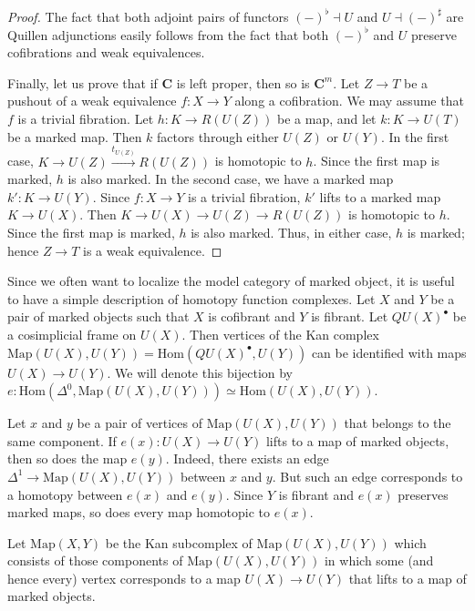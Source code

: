 \documentclass[reqno]{amsart}
\theoremstyle{definition}
\theoremstyle{remark}
\newcommand{\cat}[1]{\mathbf{#1}}
\newcommand{\C}{\cat{C}}
\newcommand{\Hom}{\mathrm{Hom}}
\newcommand{\Map}{\mathrm{Map}}
\numberwithin{figure}{section}
\begin{document}
\begin{proof}
The fact that both adjoint pairs of functors $(-)^\flat \dashv U$ and $U \dashv (-)^\sharp$ are Quillen adjunctions
easily follows from the fact that both $(-)^\flat$ and $U$ preserve cofibrations and weak equivalences.

Finally, let us prove that if $\C$ is left proper, then so is $\C^m$.
Let $Z \to T$ be a pushout of a weak equivalence $f : X \to Y$ along a cofibration.
We may assume that $f$ is a trivial fibration.
Let $h : K \to R(U(Z))$ be a map, and let $k : K \to U(T)$ be a marked map.
Then $k$ factors through either $U(Z)$ or $U(Y)$.
In the first case, $K \to U(Z) \xrightarrow{t_{U(Z)}} R(U(Z))$ is homotopic to $h$.
Since the first map is marked, $h$ is also marked.
In the second case, we have a marked map $k' : K \to U(Y)$.
Since $f : X \to Y$ is a trivial fibration, $k'$ lifts to a marked map $K \to U(X)$.
Then $K \to U(X) \to U(Z) \to R(U(Z))$ is homotopic to $h$.
Since the first map is marked, $h$ is also marked.
Thus, in either case, $h$ is marked; hence $Z \to T$ is a weak equivalence.
\end{proof}

Since we often want to localize the model category of marked object, it is useful to have a simple description of homotopy function complexes.
Let $X$ and $Y$ be a pair of marked objects such that $X$ is cofibrant and $Y$ is fibrant.
Let $QU(X)^\bullet$ be a cosimplicial frame on $U(X)$.
Then vertices of the Kan complex $\Map(U(X),U(Y)) = \Hom(QU(X)^\bullet,U(Y))$ can be identified with maps $U(X) \to U(Y)$.
We will denote this bijection by $e : \Hom(\Delta^0,\Map(U(X),U(Y))) \simeq \Hom(U(X),U(Y))$.

Let $x$ and $y$ be a pair of vertices of $\Map(U(X),U(Y))$ that belongs to the same component.
If $e(x) : U(X) \to U(Y)$ lifts to a map of marked objects, then so does the map $e(y)$.
Indeed, there exists an edge $\Delta^1 \to \Map(U(X),U(Y))$ between $x$ and $y$.
But such an edge corresponds to a homotopy between $e(x)$ and $e(y)$.
Since $Y$ is fibrant and $e(x)$ preserves marked maps, so does every map homotopic to $e(x)$.

Let $\Map(X,Y)$ be the Kan subcomplex of $\Map(U(X),U(Y))$ which consists of those components of
$\Map(U(X),U(Y))$ in which some (and hence every) vertex corresponds to a map $U(X) \to U(Y)$ that lifts to a map of marked objects.
\end{document}
